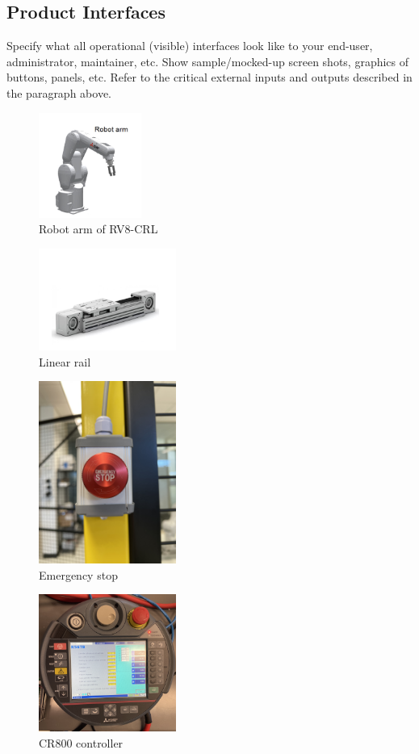 \subsection{Product Interfaces}
Specify what all operational (visible) interfaces look like to your end-user, administrator, maintainer, etc. Show sample/mocked-up screen shots, graphics of buttons, panels, etc. Refer to the critical external inputs and outputs described in the paragraph above.

\begin{figure}[h!]
	\centering
   	\includegraphics[width=0.30\textwidth]{images/RobotArm.jpg}
    \caption{Robot arm of RV8-CRL
    }
\end{figure}
\begin{figure}[h!]
	\centering
   	\includegraphics[width=0.40\textwidth]{images/LinearRail.jpg}
    \caption{Linear rail}
\end{figure}

\begin{figure}[h!]
	\centering
   	\includegraphics[width=0.40\textwidth, angle = -90]{images/EStop.JPG}
    \caption{Emergency stop}
\end{figure}

\begin{figure}[h!]
	\centering
   	\includegraphics[width=0.40\textwidth]{images/CR800.jpg}
    \caption{CR800 controller}
\end{figure}



